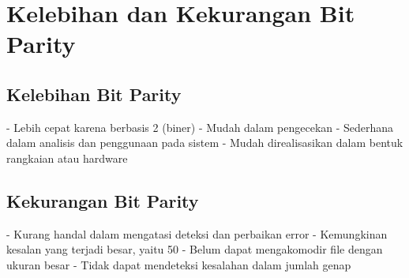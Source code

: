 
\section{Kelebihan dan Kekurangan Bit Parity}
\subsection{Kelebihan Bit Parity}
-   Lebih cepat karena berbasis 2 (biner)
-   Mudah dalam pengecekan
-   Sederhana dalam analisis dan penggunaan pada sistem
-   Mudah direalisasikan dalam bentuk rangkaian atau hardware

\subsection{Kekurangan Bit Parity}
-   Kurang handal dalam mengatasi deteksi dan perbaikan error
-   Kemungkinan kesalan yang terjadi besar, yaitu 50%
-   Belum dapat mengakomodir file dengan ukuran besar
-   Tidak dapat mendeteksi kesalahan dalam jumlah genap



